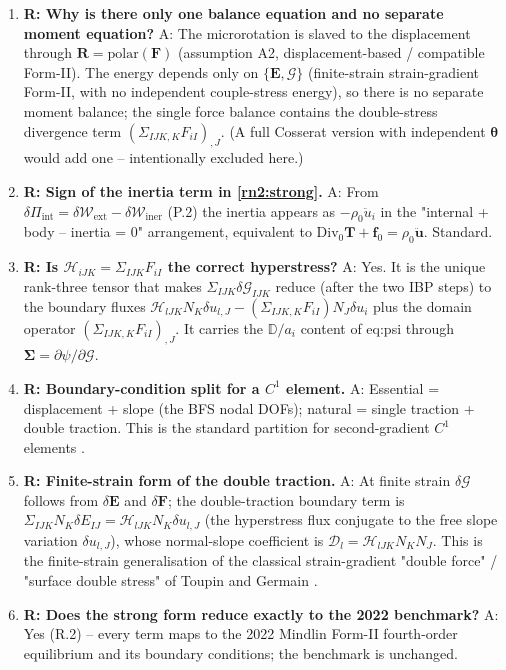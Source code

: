 \documentclass[11pt]{article}
\begin{document}
\begin{enumerate}
\item \textbf{R: Why is there only one balance equation and no separate moment equation?}
A: The microrotation is slaved to the displacement through $\mathbf{R}=\mathrm{polar}(\mathbf{F})$ (assumption A2, displacement-based / compatible Form-II). The energy depends only on $\{\mathbf{E},\bm{\mathcal{G}}\}$ (finite-strain strain-gradient Form-II, with no independent couple-stress energy), so there is no separate moment balance; the single force balance contains the double-stress divergence term $(\Sigma_{IJK,K}F_{iI})_{,J}$. (A full Cosserat version with independent $\boldsymbol{\theta}$ would add one -- intentionally excluded here.)

\item \textbf{R: Sign of the inertia term in \eqref{rn2:strong}.}
A: From $\delta\Pi_{\mathrm{int}}=\delta\mathcal{W}_{\mathrm{ext}}-\delta\mathcal{W}_{\mathrm{iner}}$ (P.2) the inertia appears as $-\rho_0\ddot{u}_i$ in the "internal + body -- inertia = 0" arrangement, equivalent to $\mathrm{Div}_0\mathbf{T}+\mathbf{f}_0=\rho_0\ddot{\mathbf{u}}$. Standard. \checkmark

\item \textbf{R: Is $\mathcal{H}_{iJK}=\Sigma_{IJK}F_{iI}$ the correct hyperstress?}
A: Yes. It is the unique rank-three tensor that makes $\Sigma_{IJK}\delta\mathcal{G}_{IJK}$ reduce (after the two IBP steps) to the boundary fluxes $\mathcal{H}_{lJK}N_K\delta u_{l,J}-(\Sigma_{IJK,K}F_{iI})N_J\delta u_i$ plus the domain operator $(\Sigma_{IJK,K}F_{iI})_{,J}$. It carries the $\mathbb{D}/a_i$ content of eq:psi through $\boldsymbol{\Sigma}=\partial\psi/\partial\bm{\mathcal{G}}$. \checkmark

\item \textbf{R: Boundary-condition split for a $C^1$ element.}
A: Essential = displacement + slope (the BFS nodal DOFs); natural = single traction + double traction. This is the standard partition for second-gradient $C^1$ elements \cite{AmanatidouAravas2002,EngelGarikipati2002}. \checkmark

\item \textbf{R: Finite-strain form of the double traction.}
A: At finite strain $\delta\bm{\mathcal{G}}$ follows from $\delta\mathbf{E}$ and $\delta\mathbf{F}$; the double-traction boundary term is $\Sigma_{IJK}N_K\delta E_{IJ}=\mathcal{H}_{lJK}N_K\delta u_{l,J}$ (the hyperstress flux conjugate to the free slope variation $\delta u_{l,J}$), whose normal-slope coefficient is $\mathcal{D}_l=\mathcal{H}_{lJK}N_KN_J$. This is the finite-strain generalisation of the classical strain-gradient "double force" / "surface double stress" of Toupin and Germain \cite{Toupin1964,Germain1973}. \checkmark

\item \textbf{R: Does the strong form reduce exactly to the 2022 benchmark?}
A: Yes (R.2) -- every term maps to the 2022 Mindlin Form-II fourth-order equilibrium and its boundary conditions; the benchmark is unchanged. \checkmark
\end{enumerate}
\end{document}
